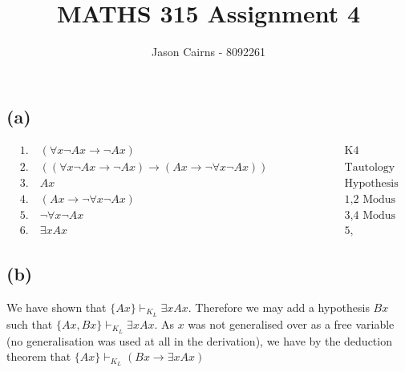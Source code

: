 \documentclass[11pt,oneside,a4paper]{article}
\begin{document}
\title{MATHS 315 Assignment 4}
\author{Jason Cairns - 8092261}
\maketitle

\section{}
\subsection*{(a)}

\begin{align*}
&1. \quad (\forall x \neg Ax \to \neg Ax) \quad \quad \quad \quad \quad \quad &\text{K4}\\
&2. \quad ((\forall x \neg Ax \to \neg Ax) \to (Ax \to \neg \forall x \neg Ax)) \quad \quad \quad \quad \quad \quad &\text{Tautology Instance}\\
&3. \quad Ax \quad \quad \quad \quad \quad \quad &\text{Hypothesis}\\
&4. \quad (Ax \to \neg \forall x \neg Ax) \quad \quad \quad \quad \quad \quad &\text{1,2 Modus Ponens}\\
&5. \quad \neg \forall x \neg Ax \quad \quad \quad \quad \quad \quad &\text{3,4 Modus Ponens}\\
&6. \quad \exists x  Ax  &\text{5, Abbreviation}
\end{align*}

\subsection*{(b)}
We have shown that $\{Ax\} \vdash_{K_L} \exists x Ax$. Therefore we may add a hypothesis $Bx$ such that $\{Ax, Bx\} \vdash_{K_L} \exists x Ax$. As $x$ was not generalised over as a free variable (no generalisation was used at all in the derivation), we have by the deduction theorem that $\{Ax\} \vdash_{K_L} (Bx \to \exists x  Ax)$
\end{document}

